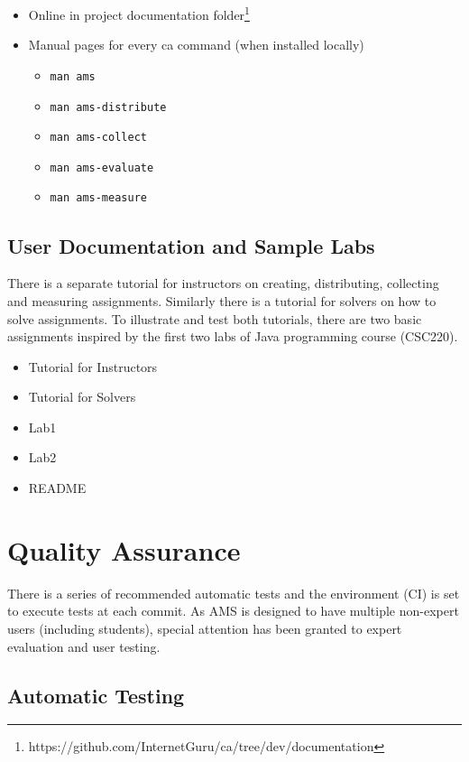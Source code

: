 \begin{itemize}
\item
  {Online in project documentation folder\footnote{https://github.com/InternetGuru/ca/tree/dev/documentation}}
\item
  {Manual pages for every ca command (when installed locally)}
  \begin{itemize}
  \item
    {\texttt{man ams}}
  \item
    {\texttt{man ams-distribute}}
  \item
    {\texttt{man ams-collect}}
  \item
    {\texttt{man ams-evaluate}}
  \item
    {\texttt{man ams-measure}}
  \end{itemize}
\end{itemize}

\subsection{User Documentation and Sample Labs}\label{ssec:userdocandlabs}

{There is a separate tutorial for instructors on creating, distributing, collecting and measuring assignments. Similarly there is a tutorial for solvers on how to solve assignments. To illustrate and test both tutorials, there are two basic assignments inspired by the first two labs of Java programming course (CSC220).}

\begin{itemize}
\item
  {Tutorial for Instructors}
\item
  {Tutorial for Solvers}
\item
  {Lab1}
\item
  {Lab2}
\item
  {README}
\end{itemize}

\section{Quality Assurance}\label{sec:qa}

{There is a series of recommended automatic tests and the environment (CI) is set to execute tests at each commit. As AMS is designed to have multiple non-expert users (including students), special attention has been granted to expert evaluation and user testing.}

\subsection{Automatic Testing}\label{ssec:autotest}

